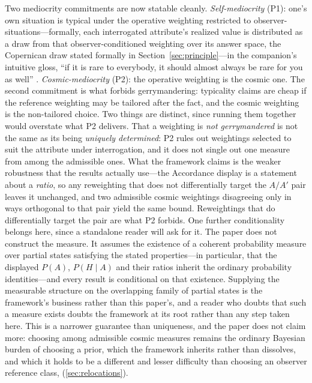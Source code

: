 Two mediocrity commitments are now statable cleanly. \emph{Self-mediocrity} (P1): one's own situation is typical under the operative weighting restricted to observer-situations---formally, each interrogated attribute's realized value is distributed as a draw from that observer-conditioned weighting over its answer space, the Copernican draw stated formally in Section~\ref{sec:principle}---in the companion's intuitive gloss, ``if it is rare to everybody, it should almost always be rare for you as well'' \cite{Nexus}. \emph{Cosmic-mediocrity} (P2): the operative weighting is the cosmic one. The second commitment is what forbids gerrymandering: typicality claims are cheap if the reference weighting may be tailored after the fact, and the cosmic weighting is the non-tailored choice. Two things are distinct, since running them together would overstate what P2 delivers. That a weighting is \emph{not gerrymandered} is not the same as its being \emph{uniquely determined}: P2 rules out weightings selected to suit the attribute under interrogation, and it does not single out one measure from among the admissible ones. What the framework claims is the weaker robustness that the results actually use---the Accordance display is a statement about a \emph{ratio}, so any reweighting that does not differentially target the $A/A'$ pair leaves it unchanged, and two admissible cosmic weightings disagreeing only in ways orthogonal to that pair yield the same bound. Reweightings that do differentially target the pair are what P2 forbids. One further conditionality belongs here, since a standalone reader will ask for it. The paper does not construct the measure. It assumes the existence of a coherent probability measure over partial states satisfying the stated properties---in particular, that the displayed $P(A)$, $P(H \mid A)$ and their ratios inherit the ordinary probability identities---and every result is conditional on that existence. Supplying the measurable structure on the overlapping family of partial states is the framework's business rather than this paper's, and a reader who doubts that such a measure exists doubts the framework at its root rather than any step taken here. This is a narrower guarantee than uniqueness, and the paper does not claim more: choosing among admissible cosmic measures remains the ordinary Bayesian burden of choosing a prior, which the framework inherits rather than dissolves, and which it holds to be a different and lesser difficulty than choosing an observer reference class, (\autoref{sec:relocations}).

